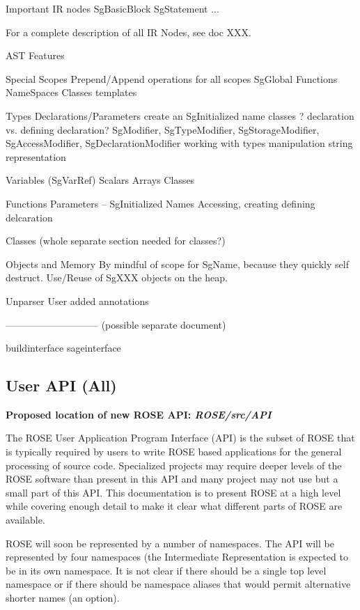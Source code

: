 {      Important IR nodes
         SgBasicBlock
         SgStatement
         ...

      For a complete description of all IR Nodes, see doc XXX.

   AST Features

      Special Scopes
         Prepend/Append operations for all scopes
         SgGlobal
         Functions
         NameSpaces
         Classes
         templates

      Types
        Declarations/Parameters create an SgInitialized name
        classes ?
        declaration vs. defining declaration?
        SgModifier, SgTypeModifier,
           SgStorageModifier, SgAccessModifier, SgDeclarationModifier
        working with types
           manipulation
           string representation

      Variables (SgVarRef)
         Scalars
         Arrays
         Classes

      Functions
           Parameters -- SgInitialized Names
              Accessing, creating
           defining delcaration

      Classes (whole separate section needed for classes?)


   Objects and Memory
      By mindful of scope for SgName, because they quickly self destruct.
      Use/Reuse of SgXXX objects on the heap.

   Unparser
      User added annotations

-----------------------------
(possible separate document)

buildinterface
sageinterface

}


\subsection{User API (All)}
{\bf Proposed location of new ROSE API: {\em ROSE/src/API}}

   The ROSE User Application Program Interface (API) is the subset of ROSE that is
typically required by users to write ROSE based applications for the general
processing of source code.  Specialized projects may
require deeper levels of the ROSE software than present in this API and many
project may not use but a small part of this API.  This documentation is
to present ROSE at a high level while covering enough detail to make it
clear what different parts of ROSE are available.

   ROSE will soon be represented by a number of namespaces.  The
API will be represented by four namespaces (the Intermediate Representation
is expected to be in its own namespace.  It is not clear if there should
be a single top level namespace or if there should be namespace
aliases that would permit alternative shorter names (an option).



